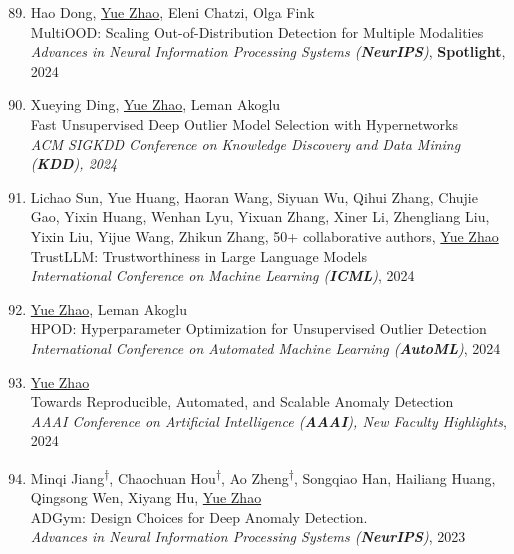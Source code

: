 \documentclass[margin,line,pifont,palatino,courier]{res}
\newcommand{\equalcontrib}{\textsuperscript{$\dagger$}}
\newenvironment{benumerate}[1]{
    \let\oldItem\item
    \def\item{\addtocounter{enumi}{-2}\oldItem}
    \begin{enumerate}[leftmargin=0.25in,label=\textcolor{uscred}{\arabic*.}]
    \setcounter{enumi}{#1}
    \addtocounter{enumi}{1}
}{
    \end{enumerate}
}
\begin{document}
\begin{resume}
\begin{benumerate}{88}
    \item 
    Hao Dong, \underline{Yue Zhao}, Eleni Chatzi, Olga Fink \\
    MultiOOD: Scaling Out-of-Distribution Detection for
    Multiple Modalities \\ 
    {\textit{Advances in Neural Information Processing Systems (\textbf{NeurIPS})}, \faAward \xspace \textbf{Spotlight}, 2024}

    \item 
    Xueying Ding, \underline{Yue Zhao}, Leman Akoglu\\
    Fast Unsupervised Deep Outlier Model Selection with Hypernetworks\\ 
    \textit{ACM SIGKDD Conference on Knowledge Discovery and Data Mining (\textbf{KDD}), 2024}


    \item 
    Lichao Sun, Yue Huang, Haoran Wang, Siyuan Wu, Qihui Zhang, Chujie Gao, Yixin Huang, Wenhan Lyu, Yixuan Zhang, Xiner Li, Zhengliang Liu, Yixin Liu, Yijue Wang, Zhikun Zhang, 50+ collaborative authors,
    \underline{Yue Zhao} \\
    TrustLLM: Trustworthiness in Large Language Models \\ 
    \textit{International Conference on Machine Learning (\textbf{ICML})}, 2024

    \item \underline{Yue Zhao}, Leman Akoglu\\
    HPOD: Hyperparameter Optimization for Unsupervised Outlier Detection \\
    \textit{International Conference on Automated Machine Learning (\textbf{AutoML})}, 2024 

    \item \underline{Yue Zhao}\\
    Towards Reproducible, Automated, and Scalable Anomaly Detection \\ 
    \textit{AAAI Conference on Artificial Intelligence (\textbf{AAAI}), New Faculty Highlights}, 2024 

    \item Minqi Jiang\equalcontrib, Chaochuan Hou\equalcontrib, Ao Zheng\equalcontrib, Songqiao Han, Hailiang Huang, Qingsong Wen, Xiyang Hu, \underline{Yue Zhao}\\
    ADGym: Design Choices for Deep Anomaly Detection.\\ 
    {\textit{Advances in Neural Information Processing Systems (\textbf{NeurIPS})}, 2023}


\end{benumerate}
\end{resume}
\end{document}
